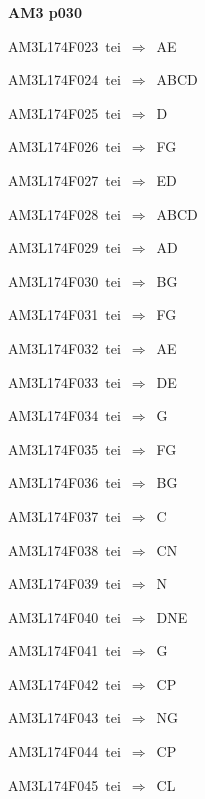 \par\vfill\eject
{\bf\hfill AM3 p030\hfill\hbox{}}\par\bigskip
{\sixrm AM3L174F023\ {\sixit tei}\ }$\Rightarrow$\ AE\par\smallskip
{\sixrm AM3L174F024\ {\sixit tei}\ }$\Rightarrow$\ ABCD\par\smallskip
{\sixrm AM3L174F025\ {\sixit tei}\ }$\Rightarrow$\ D\par\smallskip
{\sixrm AM3L174F026\ {\sixit tei}\ }$\Rightarrow$\ FG\par\smallskip
{\sixrm AM3L174F027\ {\sixit tei}\ }$\Rightarrow$\ ED\par\smallskip
{\sixrm AM3L174F028\ {\sixit tei}\ }$\Rightarrow$\ ABCD\par\smallskip
{\sixrm AM3L174F029\ {\sixit tei}\ }$\Rightarrow$\ AD\par\smallskip
{\sixrm AM3L174F030\ {\sixit tei}\ }$\Rightarrow$\ BG\par\smallskip
{\sixrm AM3L174F031\ {\sixit tei}\ }$\Rightarrow$\ FG\par\smallskip
{\sixrm AM3L174F032\ {\sixit tei}\ }$\Rightarrow$\ AE\par\smallskip
{\sixrm AM3L174F033\ {\sixit tei}\ }$\Rightarrow$\ DE\par\smallskip
{\sixrm AM3L174F034\ {\sixit tei}\ }$\Rightarrow$\ G\par\smallskip
{\sixrm AM3L174F035\ {\sixit tei}\ }$\Rightarrow$\ FG\par\smallskip
{\sixrm AM3L174F036\ {\sixit tei}\ }$\Rightarrow$\ BG\par\smallskip
{\sixrm AM3L174F037\ {\sixit tei}\ }$\Rightarrow$\ C\par\smallskip
{\sixrm AM3L174F038\ {\sixit tei}\ }$\Rightarrow$\ CN\par\smallskip
{\sixrm AM3L174F039\ {\sixit tei}\ }$\Rightarrow$\ N\par\smallskip
{\sixrm AM3L174F040\ {\sixit tei}\ }$\Rightarrow$\ DNE\par\smallskip
{\sixrm AM3L174F041\ {\sixit tei}\ }$\Rightarrow$\ G\par\smallskip
{\sixrm AM3L174F042\ {\sixit tei}\ }$\Rightarrow$\ CP\par\smallskip
{\sixrm AM3L174F043\ {\sixit tei}\ }$\Rightarrow$\ NG\par\smallskip
{\sixrm AM3L174F044\ {\sixit tei}\ }$\Rightarrow$\ CP\par\smallskip
{\sixrm AM3L174F045\ {\sixit tei}\ }$\Rightarrow$\ CL\par\smallskip
